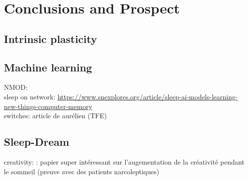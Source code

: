 \chapter{Conclusions and Prospect}


\section{Intrinsic plasticity}


\section{Machine learning}
NMOD: \citep{mei_informing_2022}\\
sleep on network: \url{https://www.snexplores.org/article/sleep-ai-models-learning-new-things-computer-memory}\\
switches: article de aurélien (TFE) \\

\section{Sleep-Dream}
creativity: \citep{lacaux_increased_2019} : papier super intéressant sur l'augementation de la créativité pendant le sommeil (preuve avec des patients narcoleptiques)

